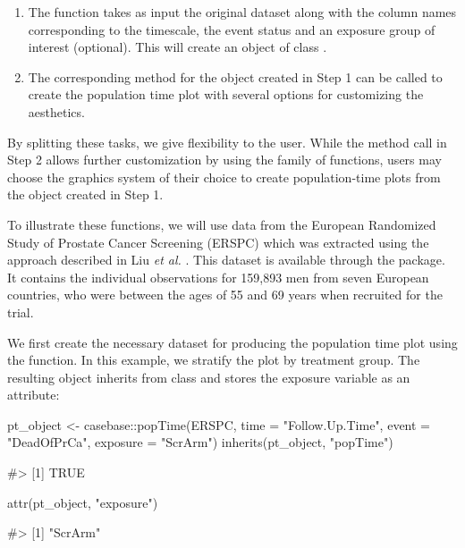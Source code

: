 \begin{enumerate}
\def\labelenumi{\arabic{enumi}.}
\tightlist
\item
  The  function takes as input the original
  dataset along with the column names corresponding to the timescale,
  the event status and an exposure group of interest (optional). This
  will create an object of class .\\
\item
  The corresponding  method for the object created in Step 1
  can be called to create the population time plot with several options
  for customizing the aesthetics.
\end{enumerate}

By splitting these tasks, we give flexibility to the user. While the
method call in Step 2 allows further customization by using the
 \citep{ggplot2} family of functions, users may choose the
graphics system of their choice to create population-time plots from the
object created in Step 1.

To illustrate these functions, we will use data from the European
Randomized Study of Prostate Cancer Screening (ERSPC)
\citep{schroder2009screening} which was extracted using the approach
described in Liu \emph{et al.} \citeyearpar{liu2014recovering}. This
dataset is available through the  package. It contains the
individual observations for 159,893 men from seven European countries,
who were between the ages of 55 and 69 years when recruited for the
trial.

We first create the necessary dataset for producing the population time
plot using the  function. In this example, we stratify the
plot by treatment group. The resulting object inherits from class
 and stores the exposure variable as an attribute:

\begin{Schunk}
\begin{Sinput}
pt_object <- casebase::popTime(ERSPC, time = "Follow.Up.Time",
                               event = "DeadOfPrCa", exposure = "ScrArm")
inherits(pt_object, "popTime")
\end{Sinput}
\begin{Soutput}
#> [1] TRUE
\end{Soutput}
\begin{Sinput}
attr(pt_object, "exposure")
\end{Sinput}
\begin{Soutput}
#> [1] "ScrArm"
\end{Soutput}
\end{Schunk}


